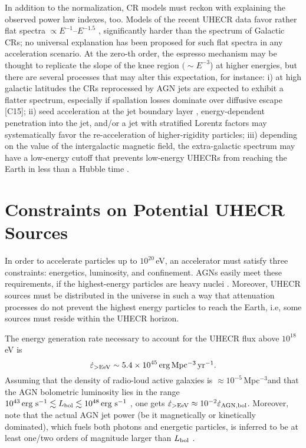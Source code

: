 \documentclass[3p,times,twocolumn]{elsarticle}
\newcommand{\Mpc}{\,Mpc$^{-3}$}
\newcommand{\yr}{\,yr$^{-1}$}
\newcommand{\s}{\,s$^{-1}$}
\newcommand{\ergs}{\mbox{\,erg\,\s}}
\begin{document}
In addition to the normalization, CR models must reckon with explaining the observed power law indexes, too. 
Models of the recent UHECR data favor rather flat spectra $\propto E^{-1}$--$E^{-1.5}$ \cite[][]{GST13,abb14,Taylor14}, significantly harder than the spectrum of Galactic CRs;
no universal explanation has been proposed for such flat spectra in any acceleration scenario.
At the zero-th order, the espresso mechanism may be thought to replicate the slope of the knee region $(\sim E^{-3}$) at higher energies, but there are several  processes that may alter this expectation, for instance:
i) at high galactic latitudes the CRs reprocessed by AGN jets are expected to exhibit a flatter spectrum, especially if spallation losses dominate over diffusive escape [C15];
ii) seed acceleration at the jet boundary layer \cite{ostrowsky00}, energy-dependent penetration into the jet, and/or a jet with stratified Lorentz factors may systematically favor the re-acceleration of higher-rigidity particles;
iii) depending on the value of the intergalactic magnetic field, the extra-galactic spectrum may have a low-energy cutoff that prevents low-energy UHECRs from reaching the Earth in less than a Hubble time \cite[e.g.,][]{mr13,as14}.


\section{Constraints on Potential UHECR Sources}\label{sec:sources}
In order to accelerate particles up to $10^{20}$\,eV, an accelerator must satisfy three constraints: energetics, luminosity, and confinement.
AGNs easily meet these requirements, if the highest-energy particles are heavy nuclei \citep[e.g.,][]{espresso,murase09}.
Moreover, UHECR sources must be distributed in the universe in such a way that attenuation processes do not prevent the highest energy particles to reach the Earth, i.e, some sources must reside within the UHECR horizon.

The energy generation rate necessary to account for the UHECR flux above $10^{18}$\,eV is \citep[e.g.,][]{Katz+13}
\begin{equation}\label{eq:energy}
\dot\varepsilon_{\rm >EeV} \sim 5.4\times 10^{45}\,{\rm erg} $\Mpc \yr$.
\end{equation}
Assuming that the density of radio-loud active galaxies is $\approx10^{-5} $\Mpc  and that the AGN bolometric luminosity lies in the range $10^{43}\ergs\lesssim L_{\rm bol}\lesssim 10^{48}\ergs$ \citep{Jiang+07,woo-urry02}, one gets
$\dot\varepsilon_{\rm >EeV} \approx 10^{-2} \dot\varepsilon_{\rm AGN,bol}$.
Moreover, note that the actual AGN jet power (be it magnetically or kinetically dominated), which fuels both photons and energetic particles, is inferred to be at least one/two orders of magnitude larger than $L_{\rm bol}$ \cite[e.g.,][]{GTG09}.
\end{document}
